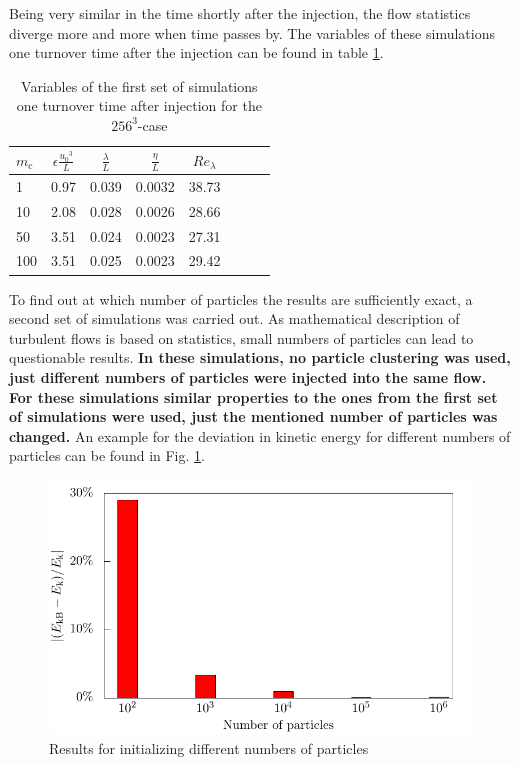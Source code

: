 \documentclass[11pt,a4paper,openany,oneside,parskip=half*]{article}
\begin{document}
\newline
Being very similar in the time shortly after the injection, the flow statistics diverge more and more when time passes by. The variables of these simulations one turnover time after the injection can be found in table \ref{table_properties}. 
\begin{table}[h]
\begin{center}
\begin{tabular}{l | c c c c c c c }
$m_\mathrm{c}$ & $\epsilon \frac{{u_0}^3}{L}$ & $\frac{\lambda}{L}$ & $\frac{\eta}{L} $ & $Re_\lambda$ \\
\hline
\hline
1 & 0.97& 0.039 & 0.0032 & 38.73 &\\
10 & 2.08 & 0.028 & 0.0026 & 28.66 &\\
50 & 3.51 & 0.024 & 0.0023 & 27.31 &\\
100 & 3.51 & 0.025 & 0.0023 & 29.42 &\\
\hline
\end{tabular}
\caption{Variables of the first set of simulations one turnover time after injection for the $256^3$-case}
\label{table_properties}
\end{center}
\end{table}
\newline
To find out at which number of particles the results are sufficiently exact, a second set of simulations was carried out. As mathematical description of turbulent flows is based on statistics, small numbers of particles can lead to questionable results. \textbf{In these simulations, no particle clustering was used, just different numbers of particles were injected into the same flow. For these simulations similar properties to the ones from the first set of simulations were used, just the mentioned number of particles was changed.} An example for the deviation in kinetic energy for different numbers of particles can be found in Fig. \ref{kineticEnergy_numberOfParticles}. 
\begin{figure}[h]
	\centering
  \includegraphics[width=\textwidth]{./../Simulationsergebnisse/variationPartikelAnzahl/128/kineticEnergy_numberOfParticles.pdf}
	\caption{Results for initializing different numbers of particles}
	\label{kineticEnergy_numberOfParticles}
\end{figure}
\end{document}
